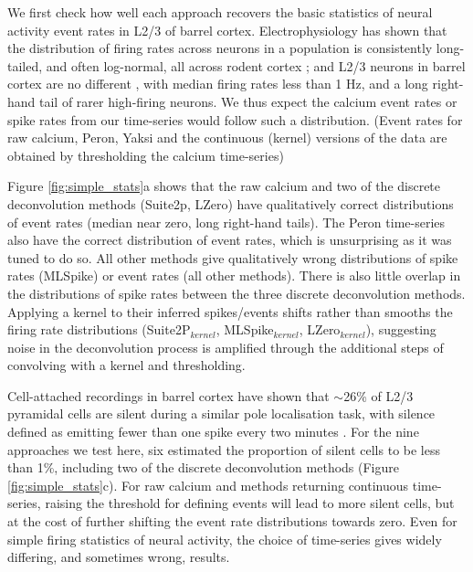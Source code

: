 \documentclass[a4paper,11pt]{article}
\begin{document}
We first check how well each approach recovers the basic statistics of neural activity event rates in L2/3 of barrel cortex. Electrophysiology has shown that the distribution of firing rates across neurons in a population is consistently long-tailed, and often log-normal, all across rodent cortex \citep{Wohrer2013-rp}; and L2/3 neurons in barrel cortex are no different \citep{OConnor2010-hd}, with median firing rates less than 1 Hz, and a long right-hand tail of rarer high-firing neurons. We thus expect the calcium event rates or spike rates from our time-series would follow such a distribution. (Event rates for raw calcium, Peron, Yaksi and the continuous (kernel) versions of the data are obtained by thresholding the calcium time-series)

Figure \ref{fig:simple_stats}a shows that the raw calcium and two of the discrete deconvolution methods (Suite2p, LZero) have qualitatively correct distributions of event rates (median near zero, long right-hand tails). The Peron time-series also have the correct distribution of event rates, which is unsurprising as it was tuned to do so. All other methods give qualitatively wrong distributions of spike rates (MLSpike) or event rates (all other methods). There is also little overlap in the distributions of spike rates between the three discrete deconvolution methods. Applying a kernel to their inferred spikes/events shifts rather than smooths the firing rate distributions (Suite2P$_{kernel}$, MLSpike$_{kernel}$, LZero$_{kernel}$), suggesting noise in the deconvolution process is amplified through the additional steps of convolving with a kernel and thresholding.

Cell-attached recordings in barrel cortex have shown that $\sim$26\% of L2/3 pyramidal cells are silent during a similar pole localisation task, with silence defined as emitting fewer than one spike every two minutes \citep{OConnor2010-hd}. For the nine approaches we test here, six estimated the proportion of silent cells to be less than 1\%, including two of the discrete deconvolution methods (Figure \ref{fig:simple_stats}c). For raw calcium and methods returning continuous time-series, raising the threshold for defining events will lead to more silent cells, but at the cost of further shifting the event rate distributions towards zero. Even for simple firing statistics of neural activity, the choice of time-series gives widely differing, and sometimes wrong, results.
\end{document}
